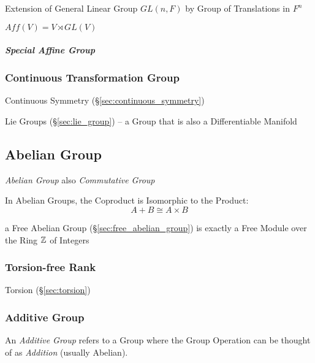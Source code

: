 Extension of General Linear Group $GL(n,F)$ by Group of Translations in $F^n$

$Aff(V) = V \rtimes GL(V)$



\subparagraph{Special Affine Group}\label{sec:special_affine_group}\hfill



\subsubsection{Continuous Transformation Group}
\label{sec:continuous_transformation_group}

Continuous Symmetry (\S\ref{sec:continuous_symmetry})

Lie Groups (\S\ref{sec:lie_group}) -- a Group that is also a
Differentiable Manifold



\subsection{Abelian Group}\label{sec:abelian_group}

\emph{Abelian Group} also \emph{Commutative Group}

In Abelian Groups, the Coproduct is Isomorphic to the Product:
\[
  A + B \cong A \times B
\]

\fist a Free Abelian Group (\S\ref{sec:free_abelian_group}) is exactly a Free
Module over the Ring $\mathbb{Z}$ of Integers



\subsubsection{Torsion-free Rank}\label{sec:torsionfree_rank}

Torsion (\S\ref{sec:torsion})



\subsubsection{Additive Group}\label{sec:additive_group}

An \emph{Additive Group} refers to a Group where the Group Operation
can be thought of as \emph{Addition} (usually Abelian).




